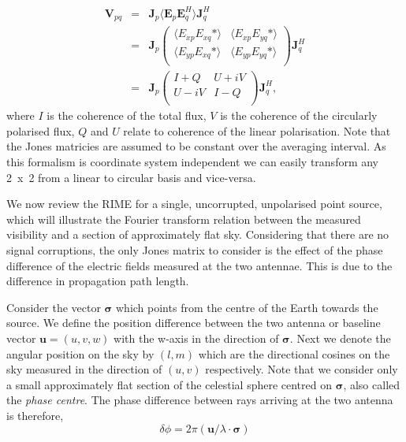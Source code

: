 \begin{eqnarray}
\bm{V}_{pq} &= & \bm{J}_p \langle {\bm E}_p  {\bm E}_q^H \rangle \bm{J}_q^H \\
&=&  \bm{J}_p\left(
\begin{array}{cc}
\langle E_{xp} E_{xq}* \rangle & \langle E_{xp} E_{yq}* \rangle \\
\langle E_{yp} E_{xq}* \rangle & \langle E_{yp} E_{yq}* \rangle \\
\end{array} 
\right) \bm{J}_q^H \\ 
&=&
 \bm{J}_p \left(
\begin{array}{cc}
I+Q & U +iV\\
U-iV & I-Q \\
\end{array}
\right)\bm{J}_q^H,
\end{eqnarray}
where $I$ is the coherence of the total flux, $V$ is the coherence of the circularly polarised flux, $Q$ and $U$ relate to coherence of the linear polarisation. Note that the Jones matricies are assumed to be constant over the averaging interval. As this formalism is coordinate system independent we can easily transform any 2~x~2 from a linear to circular basis and vice-versa. 

We now review the RIME for a single, uncorrupted, unpolarised point source, which will illustrate the Fourier transform relation between the measured visibility and a section of approximately flat sky.
Considering that there are no signal corruptions, the only Jones matrix to consider is the effect of the phase difference of the electric fields measured at the two antennae. This is due to the difference in propagation path length.


Consider the vector $\bm{\sigma}$ which points from the centre of the Earth towards the source. We define the position difference between the two antenna or baseline vector $\bm{u} = (u,v,w)$ with the w-axis in the direction of $\bm{\sigma}$. Next we denote the angular position on the sky by $(l, m)$ which are the directional cosines on the sky measured in the direction of $(u, v)$ respectively. Note that we consider only a small approximately flat section of the celestial sphere centred on $\bm{\sigma}$, also called the \emph{phase centre}. The phase difference between rays arriving at the two antenna is therefore,
\begin{equation}
 \delta \phi = 2\pi (\bm{u}/\lambda \cdot \bm{\sigma})
\end{equation}

